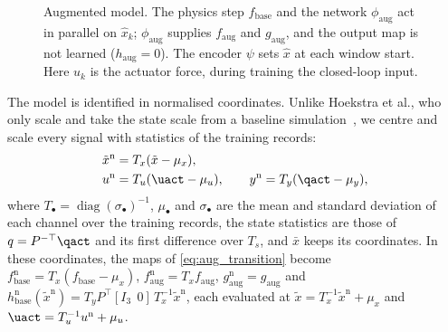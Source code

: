 \begin{figure}[t]
 \centering
 \resizebox{\columnwidth}{!}{}
 \caption{Augmented model. The physics step $f_{\mathrm{base}}$ and the
 network $\phi_{\mathrm{aug}}$ act in parallel on $\hat x_k$;
 $\phi_{\mathrm{aug}}$ supplies $f_{\mathrm{aug}}$ and $g_{\mathrm{aug}}$,
 and the output map is not learned ($h_{\mathrm{aug}}=0$). The encoder
 $\psi$ sets $\hat x$ at each window start. Here $u_k$ is the actuator force,
 during training the closed-loop input.
 }
 \label{fig:aug_structure}
\end{figure}

The model is identified in normalised coordinates.
Unlike Hoekstra et al., who only scale and take the state scale from a
baseline simulation~\cite[Sec.~5.3]{hoekstra2026lfr}, we centre and scale every
signal with statistics of the training records:
\begin{equation}
\begin{aligned}
 \tilde x^{\mathrm n}&=T_x(\tilde x-\mu_x),\\
 u^{\mathrm n}&=T_u(\uact-\mu_u),\qquad
 y^{\mathrm n}=T_y(\qact-\mu_y),
\end{aligned}
 \label{eq:aug_norm}
\end{equation}
where $T_\bullet=\operatorname{diag}(\sigma_\bullet)^{-1}$, $\mu_\bullet$ and
$\sigma_\bullet$ are the mean and standard deviation of each channel over the
training records, the state statistics are those of $q=P^{-\top}\qact$ and its
first difference over $T_s$, and $\bar x$ keeps its coordinates.
In these coordinates, the maps of \eqref{eq:aug_transition} become
$f^{\mathrm n}_{\mathrm{base}}=T_x(f_{\mathrm{base}}-\mu_x)$,
$f^{\mathrm n}_{\mathrm{aug}}=T_xf_{\mathrm{aug}}$,
$g^{\mathrm n}_{\mathrm{aug}}=g_{\mathrm{aug}}$ and
$h^{\mathrm n}_{\mathrm{base}}(\tilde x^{\mathrm n})=T_yP^\top[I_3\;\,0]\,T_x^{-1}\tilde x^{\mathrm n}$,
each evaluated at $\tilde x=T_x^{-1}\tilde x^{\mathrm n}+\mu_x$ and
$\uact=T_u^{-1}u^{\mathrm n}+\mu_u$.


